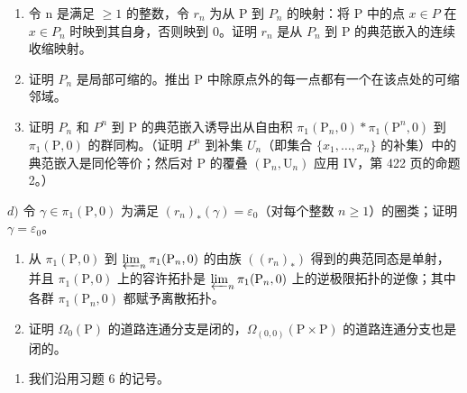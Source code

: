 \begin{enumerate}
\def\labelenumi{\alph{enumi})}
\item
  令 n 是满足 \(\geqslant 1\) 的整数，令 \(r_{n}\) 为从 P 到 \(P_{n}\) 的映射：将 P 中的点 \(x \in P\) 在 \(x \in P_{n}\) 时映到其自身，否则映到 0。证明 \(r_{n}\) 是从 \(P_{n}\) 到 P 的典范嵌入的连续收缩映射。
\item
  证明 \(P_{n}\) 是局部可缩的。推出 P 中除原点外的每一点都有一个在该点处的可缩邻域。
\item
  证明 \(P_{n}\) 和 \(P^{n}\) 到 P 的典范嵌入诱导出从自由积 \(\pi_{1}(\mathrm{P}_{n},0)*\pi_{1}(\mathrm{P}^{n},0)\) 到 \(\pi_{1}(\mathrm{P},0)\) 的群同构。（证明 \(P^{n}\) 到补集 \(U_{n}\)（即集合 \(\{x_{1},\ldots,x_{n}\}\) 的补集）中的典范嵌入是同伦等价；然后对 P 的覆叠 \((\mathrm{P}_{n},\mathrm{U}_{n})\) 应用 IV，第 422 页的命题 2。）
\end{enumerate}

\(d)\) 令 \(\gamma \in \pi_1(\mathrm{P},0)\) 为满足 \((r_n)_*(\gamma) = \varepsilon_0\)（对每个整数 \(n \geqslant 1\)）的圈类；证明 \(\gamma = \varepsilon_0\)。

\begin{enumerate}
\def\labelenumi{\alph{enumi})}
\setcounter{enumi}{4}
\item
  从 \(\pi_1(\mathrm{P},0)\) 到 \(\varprojlim_{n}\pi_{1}(\mathrm{P}_{n},0)\) 的由族 \(((r_n)_*)\) 得到的典范同态是单射，并且 \(\pi_1(\mathrm{P},0)\) 上的容许拓扑是 \(\varprojlim_{n}\pi_{1}(\mathrm{P}_{n},0)\) 上的逆极限拓扑的逆像；其中各群 \(\pi_1(\mathrm{P}_n,0)\) 都赋予离散拓扑。
\item
  证明 \(\Omega_{0}(\mathrm{P})\) 的道路连通分支是闭的，\(\Omega_{(0,0)}(\mathrm{P} \times \mathrm{P})\) 的道路连通分支也是闭的。
\end{enumerate}

\begin{enumerate}
\def\labelenumi{\arabic{enumi})}
\setcounter{enumi}{6}
\tightlist
\item
  我们沿用习题 6 的记号。
\end{enumerate}

